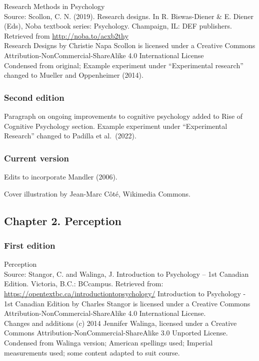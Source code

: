 \documentclass[
]{krantz}
\begin{document}
Research Methods in Psychology\\
Source: Scollon, C. N. (2019). Research designs. In R. Biswas-Diener \& E. Diener (Eds), Noba textbook series: Psychology. Champaign, IL: DEF publishers. Retrieved from \url{http://noba.to/acxb2thy}\\
Research Designs by Christie Napa Scollon is licensed under a Creative Commons Attribution-NonCommercial-ShareAlike 4.0 International License\\
Condensed from original; Example experiment under ``Experimental research'' changed to Mueller and Oppenheimer (2014).

\subsubsection*{Second edition}\label{second-edition-1}


Paragraph on ongoing improvements to cognitive psychology added to Rise of Cognitive Psychology section. Example experiment under ``Experimental Research'' changed to Padilla et al.~(2022).

\subsubsection*{Current version}\label{current-version-1}


Edits to incorporate Mandler (2006).

Cover illustration by Jean-Marc Côté, Wikimedia Commons.

\subsection*{Chapter 2. Perception}\label{chapter-2.-perception}


\subsubsection*{First edition}\label{first-edition-2}


Perception\\
Source: Stangor, C. and Walinga, J. Introduction to Psychology -- 1st Canadian Edition. Victoria, B.C.: BCcampus. Retrieved from: \url{https://opentextbc.ca/introductiontopsychology/}
Introduction to Psychology - 1st Canadian Edition by Charles Stangor is licensed under a Creative Commons Attribution-NonCommercial-ShareAlike 4.0 International License.\\
Changes and additions (c) 2014 Jennifer Walinga, licensed under a Creative Commons Attribution-NonCommercial-ShareAlike 3.0 Unported License.\\
Condensed from Walinga version; American spellings used; Imperial measurements used; some content adapted to suit course.
\end{document}
